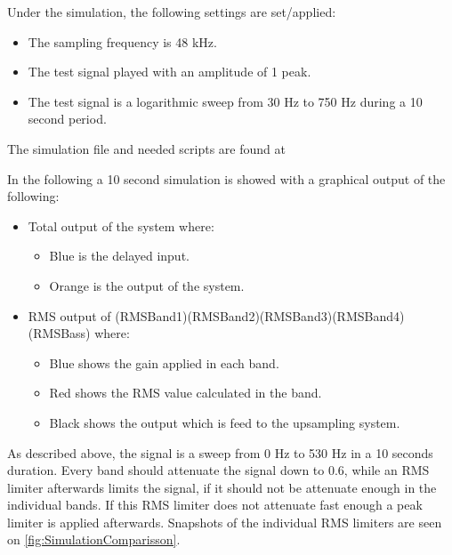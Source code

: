 Under the simulation, the following settings are set/applied:
\begin{itemize}
\item The sampling frequency is 48 kHz.
\item The test signal played with an amplitude of 1 peak.
\item The test signal is a logarithmic sweep from 30 Hz to 750 Hz during a 10 second period.
\end{itemize}

The simulation file and needed scripts are found at  


In the following a 10 second simulation is showed with a graphical output of the following:
\begin{itemize}
\item Total output of the system where:
\begin{itemize}
\item Blue is the delayed input.
\item Orange is the output of the system.
\end{itemize}
\item RMS output of (RMSBand1)(RMSBand2)(RMSBand3)(RMSBand4)(RMSBass) where:
\begin{itemize}
\item Blue shows the gain applied in each band.
\item Red shows the RMS value calculated in the band.
\item Black shows the output which is feed to the upsampling system.
\end{itemize} 
\end{itemize}

As described above, the signal is a sweep from 0 Hz to 530 Hz in a 10 seconds duration. Every band should attenuate the signal down to 0.6, while an RMS limiter afterwards limits the signal, if it should not be attenuate enough in the individual bands. If this RMS limiter does not attenuate fast enough a peak limiter is applied afterwards. Snapshots of the individual RMS limiters are seen on \autoref{fig:SimulationComparisson}.    

